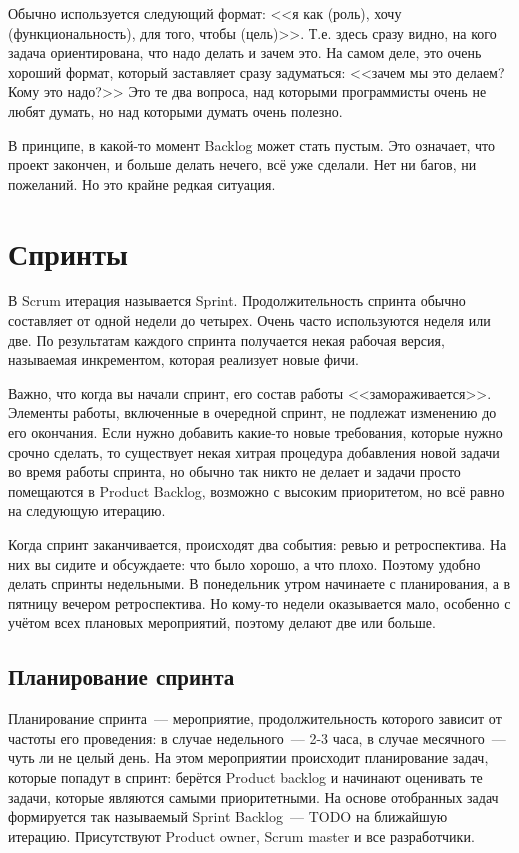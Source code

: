\documentclass{../../text-style}
\begin{document}
Обычно используется следующий формат: <<я как (роль), хочу (функциональность), для того, чтобы (цель)>>. Т.е. здесь сразу видно, на кого задача ориентирована, что надо делать и зачем это. На самом деле, это очень хороший формат, который заставляет сразу задуматься: <<зачем мы это делаем? Кому это надо?>> Это те два вопроса, над которыми программисты очень не любят думать, но над которыми думать очень полезно.

В принципе, в какой-то момент Backlog может стать пустым. Это означает, что проект закончен, и больше делать нечего, всё уже сделали. Нет ни багов, ни пожеланий. Но это крайне редкая ситуация.

\section{Спринты}

В Scrum итерация называется Sprint. Продолжительность спринта обычно составляет от одной недели до четырех. Очень часто используются неделя или две. По результатам каждого спринта получается некая рабочая версия, называемая инкрементом, которая реализует новые фичи.

Важно, что когда вы начали спринт, его состав работы <<замораживается>>. Элементы работы, включенные в очередной спринт, не подлежат изменению до его окончания. Если нужно добавить какие-то новые требования, которые нужно срочно сделать, то существует некая хитрая процедура добавления новой задачи во время работы спринта, но обычно так никто не делает и задачи просто помещаются в Product Backlog, возможно с высоким приоритетом, но всё равно на следующую итерацию.

Когда спринт заканчивается, происходят два события: ревью и ретроспектива. На них вы сидите и обсуждаете: что было хорошо, а что плохо. Поэтому удобно делать спринты недельными. В понедельник утром начинаете с планирования, а в пятницу вечером ретроспектива. Но кому-то недели оказывается мало, особенно с учётом всех плановых мероприятий, поэтому делают две или больше.

\subsection{Планирование спринта}

Планирование спринта~--- мероприятие, продолжительность которого зависит от частоты его проведения: в случае недельного~--- 2-3 часа, в случае месячного~--- чуть ли не целый день. На этом мероприятии происходит планирование задач, которые попадут в спринт: берётся Product backlog и начинают оценивать те задачи, которые являются самыми приоритетными. На основе отобранных задач формируется так называемый Sprint Backlog~--- TODO на ближайшую итерацию. Присутствуют Product owner, Scrum master и все разработчики.
\end{document}
